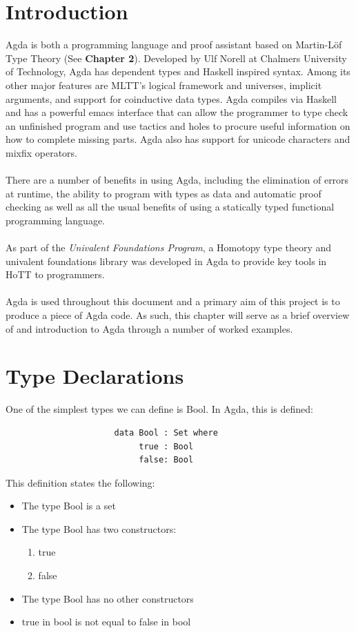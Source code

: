 \documentclass[12pt]{report}
\begin{document}
\section{Introduction}
Agda is both a programming language and proof assistant based on Martin-L\"of Type Theory (See \textbf{Chapter 2}). Developed by Ulf Norell at Chalmers University of Technology, Agda has dependent types and Haskell inspired syntax. Among its other major features are MLTT's logical framework and universes, implicit arguments, and support for coinductive data types. Agda compiles via Haskell and has a powerful emacs interface that can allow the programmer to type check an unfinished program and use tactics and holes to procure useful information on how to complete missing parts. Agda also has support for unicode characters and mixfix operators.\\
\\
There are a number of benefits in using Agda, including the elimination of errors at runtime, the ability to program with types as data and automatic proof checking as well as all the usual benefits of using a statically typed functional programming language. \\
\\
As part of the \textit{Univalent Foundations Program}, a Homotopy type theory and univalent foundations library was developed in Agda to provide key tools in HoTT to programmers\cite{hottagda}. \\
\\
Agda is used throughout this document and a primary aim of this project is to produce a piece of Agda code. As such, this chapter will serve as a brief overview of and introduction to Agda through a number of worked examples.

\newpage
\section{Type Declarations}
One of the simplest types we can define is Bool. In Agda, this is defined:
\begin{verbatim}
                      data Bool : Set where
                           true : Bool
                           false: Bool

\end{verbatim}

This definition states the following:
\begin{itemize}
\item The type Bool is a set
\item The type Bool has two constructors: \begin{enumerate} \item true \item false \end{enumerate}
\item The type Bool has no other constructors
\item true in bool is not equal to false in bool
\end{itemize}
\end{document}

